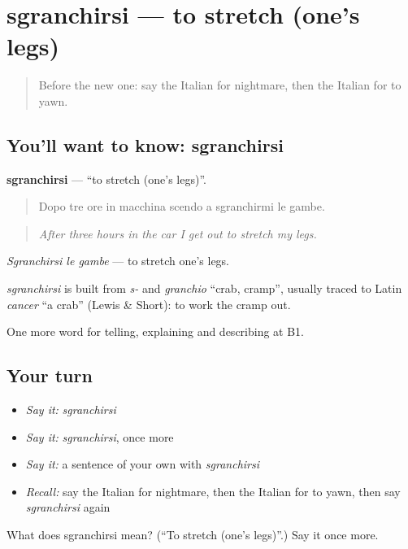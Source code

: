 \section[sgranchirsi]{sgranchirsi — to stretch (one's legs)}

\label{lesson:IT-C490-sgranchirsi}



\begin{quote}
Before the new one: say the Italian for nightmare, then the Italian for to yawn.
\end{quote}

\subsection*{You'll want to know: sgranchirsi}
\textbf{sgranchirsi} — \textquotedblleft{}to stretch (one's legs)\textquotedblright{}.

\begin{quote}
Dopo tre ore in macchina scendo a sgranchirmi le gambe.
\end{quote}

\begin{quote}
\emph{After three hours in the car I get out to stretch my legs.}
\end{quote}

\emph{Sgranchirsi le gambe} — to stretch one's legs.

\begin{cousinweb}
\emph{sgranchirsi} is built from \emph{s-} and \emph{granchio} \textquotedblleft{}crab, cramp\textquotedblright{}, usually traced to Latin \emph{cancer} \textquotedblleft{}a crab\textquotedblright{} (Lewis \& Short): to work the cramp out.
\end{cousinweb}

\begin{grammarlens}[title={What you've built}]
One more word for telling, explaining and describing at B1.
\end{grammarlens}

\subsection*{Your turn}
\begin{itemize}
\raggedright
  \item \emph{Say it:} \emph{sgranchirsi}
  \item \emph{Say it:} \emph{sgranchirsi}, once more
  \item \emph{Say it:} a sentence of your own with \emph{sgranchirsi}
  \item \emph{Recall:} say the Italian for nightmare, then the Italian for to yawn, then say \emph{sgranchirsi} again
\end{itemize}

\begin{tcolorbox}[breakable,colback=teal!4,colframe=teal!35!black,title={Before you move on}]
What does sgranchirsi mean? (\textquotedblleft{}To stretch (one's legs)\textquotedblright{}.) Say it once more.
\end{tcolorbox}
